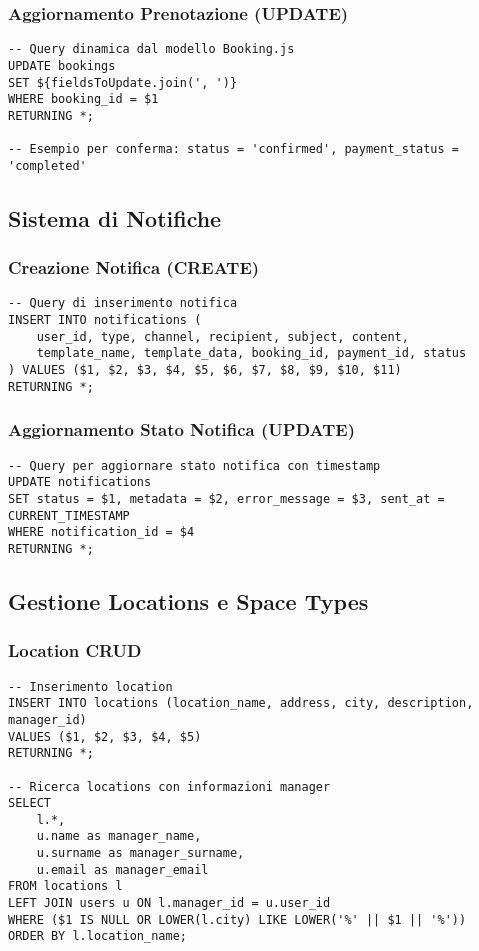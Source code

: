 \newpage

\subsubsection{Aggiornamento Prenotazione (UPDATE)}
\begin{lstlisting}[caption=Aggiornamento Stato Prenotazione]
-- Query dinamica dal modello Booking.js
UPDATE bookings 
SET ${fieldsToUpdate.join(', ')} 
WHERE booking_id = $1
RETURNING *;

-- Esempio per conferma: status = 'confirmed', payment_status = 'completed'
\end{lstlisting}

\subsection{Sistema di Notifiche}

\subsubsection{Creazione Notifica (CREATE)}
\begin{lstlisting}[caption=Inserimento Notifica dal Modello Notification.js]
-- Query di inserimento notifica
INSERT INTO notifications (
    user_id, type, channel, recipient, subject, content,
    template_name, template_data, booking_id, payment_id, status
) VALUES ($1, $2, $3, $4, $5, $6, $7, $8, $9, $10, $11)
RETURNING *;
\end{lstlisting}

\subsubsection{Aggiornamento Stato Notifica (UPDATE)}
\begin{lstlisting}[caption=Aggiornamento Stato Notifica]
-- Query per aggiornare stato notifica con timestamp
UPDATE notifications 
SET status = $1, metadata = $2, error_message = $3, sent_at = CURRENT_TIMESTAMP
WHERE notification_id = $4 
RETURNING *;
\end{lstlisting}

\newpage

\subsection{Gestione Locations e Space Types}

\subsubsection{Location CRUD}
\begin{lstlisting}[caption=Query Location dal Modello Location.js]
-- Inserimento location
INSERT INTO locations (location_name, address, city, description, manager_id)
VALUES ($1, $2, $3, $4, $5)
RETURNING *;

-- Ricerca locations con informazioni manager
SELECT 
    l.*,
    u.name as manager_name,
    u.surname as manager_surname,
    u.email as manager_email
FROM locations l
LEFT JOIN users u ON l.manager_id = u.user_id
WHERE ($1 IS NULL OR LOWER(l.city) LIKE LOWER('%' || $1 || '%'))
ORDER BY l.location_name;
\end{lstlisting}

